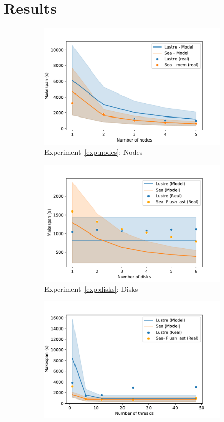 \documentclass{report}
\begin{document}
    \section{Results}\label{results}
    \begin{figure}
        \begin{subfigure}{0.5\textwidth}
            \centering
            \includegraphics[width=0.8\linewidth]{figures/nodes.pdf}
            \caption{Experiment~\ref{exp:nodes}: Nodes}
            \label{fig:nodes}
        \end{subfigure}%
        \begin{subfigure}{0.5\textwidth}
            \centering
            \includegraphics[width=0.8\linewidth]{figures/disks.pdf}
            \caption{Experiment~\ref{exp:disks}: Disks}
            \label{fig:disks}
        \end{subfigure}
        \begin{subfigure}{0.5\textwidth}
            \centering
            \includegraphics[width=0.8\linewidth]{figures/threads.pdf}

\end{subfigure}
\end{figure}
\end{document}

